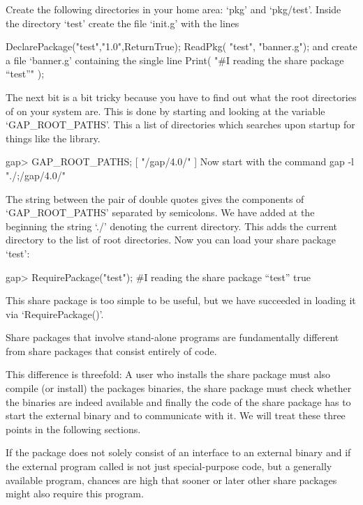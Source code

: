 Create the following  directories in your home area:  `pkg' and
`pkg/test'. Inside the directory `test' create the file `init.g' with
the lines

\begintt
DeclarePackage("test","1.0",ReturnTrue);
ReadPkg( "test", "banner.g");
\endtt
and create a file `banner.g' containing the single line
\begintt
Print( "#I reading the share package ``test''\n" );
\endtt

The next bit is a bit tricky because you have to find out what the
root directories of {\GAP} on your system are.  This is done by
starting {\GAP} and looking at the variable `GAP_ROOT_PATHS'. This a
list of directories which {\GAP} searches upon startup for things like
the {\GAP} library.

\begintt
gap> GAP_ROOT_PATHS;
[ "/gap/4.0/" ]
\endtt
Now start {\GAP} with the command 
\begintt
gap -l "./;/gap/4.0/"
\endtt

The string between the pair of double quotes gives the components of
`GAP_ROOT_PATHS' separated by semicolons. We have added at the beginning
the string `./' denoting the current directory. This adds the current
directory to the list of {\GAP} root directories.  Now you can load your
share package `test':

\begintt
gap> RequirePackage("test");
#I reading the share package ``test''
true
\endtt

This share package is too simple to be useful, but we have succeeded in
loading it via `RequirePackage()'.


Share packages that  involve stand-alone programs are fundamentally
different from share packages that consist entirely of {\GAP} code.

This difference is threefold: A  user who installs the share package
must also  compile (or install) the packages  binaries, the share
package must  check whether the binaries  are indeed available and
finally the {\GAP} code of the share package has to start the external
binary and to communicate with it. We will treat these three points in
the following sections.

If the package does not solely consist of an interface to an external
binary and if the external program called is not just special-purpose
code, but a generally available program, chances are high that sooner
or later other share packages might also require this program.

